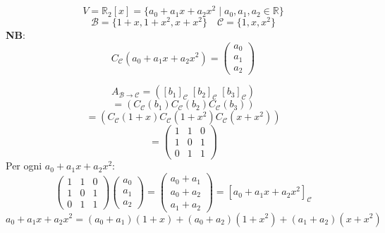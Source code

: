 \documentclass[a4paper]{article}
\theoremstyle{break}
\theoremstyle{break}
\theoremstyle{break}
\theoremstyle{break}
\begin{document}
\begin{example}
  \[
    V = \mathbb{R}_2[x]=\{a_0 + a_1 x + a_2 x^2 \;|\; a_0,a_1,a_2 \in \mathbb{R}\} 
  \] 
  \[
  \mathcal{B} = \{1 + x, 1 + x^2, x + x^2\} \quad \mathcal{C} = \{1, x, x^2\} 
  \] 
  \textbf{NB}: \[ C_ \mathcal{C}(a_0 + a_1 x + a_2 x^2) = \begin{pmatrix} 
    a_0\\
    a_1\\
    a_2
  \end{pmatrix}  \]

  \[
    A_{\mathcal{B} \to \mathcal{C}} =  \left( [b_1]_ \mathcal{C} \; [b_2]_ \mathcal{C}\; [b_3]_ \mathcal{C} \right) 
  \] 
  \[
   = \left( C_ \mathcal{C}(b_1) C_ \mathcal{C}(b_2) C_ \mathcal{C}(b_3) \right)
  \] 
  \[
  = \left( C_ \mathcal{C}(1+x) C_ \mathcal{C}(1+x^2) C_ \mathcal{C}(x+x^2) \right)
  \] 
  \[
  = 
  \begin{pmatrix} 
    1 & 1 & 0\\
    1 & 0 & 1\\
    0 & 1 & 1
  \end{pmatrix} 
  \] 
  Per ogni \( a_0 + a_1 x + a_2 x^2 \):
  \[
  \begin{pmatrix} 
    1 & 1 & 0\\
    1 & 0 & 1\\
    0 & 1 & 1
  \end{pmatrix} 
  \begin{pmatrix} 
    a_0\\
    a_1\\
    a_2
  \end{pmatrix} 
  =
  \begin{pmatrix} 
    a_0 + a_1\\
    a_0 + a_2\\
    a_1 + a_2
  \end{pmatrix} 
  =
  [a_0 + a_1 x + a_2 x^2]_ \mathcal{C}
  \] 
  \vspace{1em}
  \[
  a_0 + a_1 x + a_2 x^2 = (a_0 + a_1)(1+x) + (a_0 + a_2)(1+x^2) + (a_1 + a_2)(x+x^2)
  \] 
\end{example}
\end{document}
